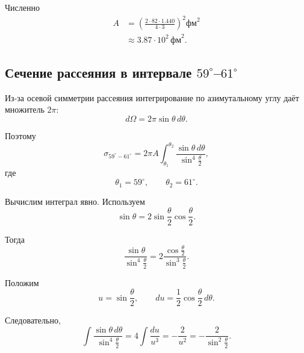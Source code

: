 \documentclass[../final.tex]{subfiles}
\begin{document}
Численно
%
\begin{align*}
    A
    &=
    \left(
        \frac{2\cdot82\cdot1.440}
             {4\cdot3}
    \right)^2
    \text{фм}^2
    \\
    &\approx
    3.87\cdot10^2\,\text{фм}^2.
\end{align*}



\subsection*{Сечение рассеяния в интервале \texorpdfstring{$59^\circ$--$61^\circ$}{59--61 degrees}}

Из-за осевой симметрии рассеяния интегрирование по азимутальному
углу даёт множитель $2\pi$:
%
\begin{equation*}
    d\Omega
    =
    2\pi\sin\theta\,d\theta.
\end{equation*}

Поэтому
%
\begin{equation*}
    \sigma_{59^\circ-61^\circ}
    =
    2\pi A
    \int_{\theta_1}^{\theta_2}
    \frac{\sin\theta\,d\theta}
         {\sin^4\frac{\theta}{2}},
\end{equation*}
%
где
%
\begin{equation*}
    \theta_1=59^\circ,
    \qquad
    \theta_2=61^\circ.
\end{equation*}

Вычислим интеграл явно. Используем
%
\begin{equation*}
    \sin\theta
    =
    2\sin\frac{\theta}{2}
     \cos\frac{\theta}{2}.
\end{equation*}

Тогда
%
\begin{equation*}
    \frac{\sin\theta}
         {\sin^4\frac{\theta}{2}}
    =
    2\frac{\cos\frac{\theta}{2}}
            {\sin^3\frac{\theta}{2}}.
\end{equation*}

Положим
%
\begin{equation*}
    u
    =
    \sin\frac{\theta}{2},
    \qquad
    du
    =
    \frac12\cos\frac{\theta}{2}\,d\theta.
\end{equation*}

Следовательно,
%
\begin{equation*}
    \int
    \frac{\sin\theta\,d\theta}
         {\sin^4\frac{\theta}{2}}
    =
    4\int\frac{du}{u^3}
    =
    -\frac{2}{u^2}
    =
    -\frac{2}{\sin^2\frac{\theta}{2}}.
\end{equation*}
\end{document}
